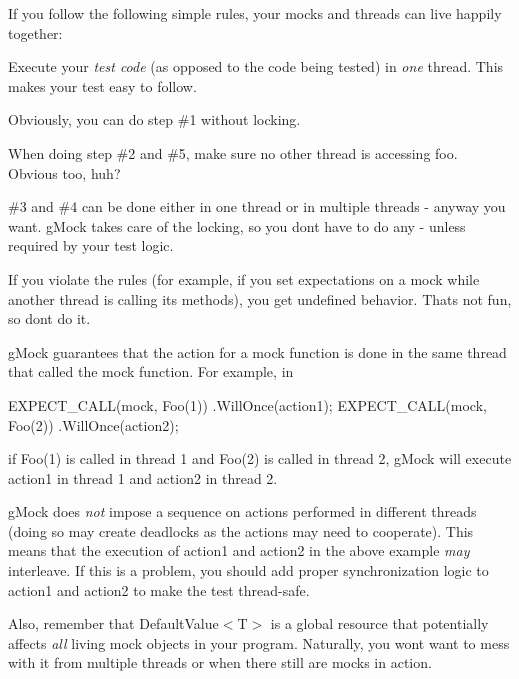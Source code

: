 If you follow the following simple rules, your mocks and threads can live happily together\+:


\begin{DoxyItemize}
\item Execute your {\itshape test code} (as opposed to the code being tested) in {\itshape one} thread. This makes your test easy to follow.
\item Obviously, you can do step \#1 without locking.
\item When doing step \#2 and \#5, make sure no other thread is accessing {\ttfamily foo}. Obvious too, huh?
\item \#3 and \#4 can be done either in one thread or in multiple threads -\/ anyway you want. g\+Mock takes care of the locking, so you don\textquotesingle{}t have to do any -\/ unless required by your test logic.
\end{DoxyItemize}

If you violate the rules (for example, if you set expectations on a mock while another thread is calling its methods), you get undefined behavior. That\textquotesingle{}s not fun, so don\textquotesingle{}t do it.

g\+Mock guarantees that the action for a mock function is done in the same thread that called the mock function. For example, in


\begin{DoxyCode}
EXPECT\_CALL(mock, Foo(1))
    .WillOnce(action1);
EXPECT\_CALL(mock, Foo(2))
    .WillOnce(action2);
\end{DoxyCode}


if {\ttfamily Foo(1)} is called in thread 1 and {\ttfamily Foo(2)} is called in thread 2, g\+Mock will execute {\ttfamily action1} in thread 1 and {\ttfamily action2} in thread 2.

g\+Mock does {\itshape not} impose a sequence on actions performed in different threads (doing so may create deadlocks as the actions may need to cooperate). This means that the execution of {\ttfamily action1} and {\ttfamily action2} in the above example {\itshape may} interleave. If this is a problem, you should add proper synchronization logic to {\ttfamily action1} and {\ttfamily action2} to make the test thread-\/safe.

Also, remember that {\ttfamily Default\+Value$<$T$>$} is a global resource that potentially affects {\itshape all} living mock objects in your program. Naturally, you won\textquotesingle{}t want to mess with it from multiple threads or when there still are mocks in action.

